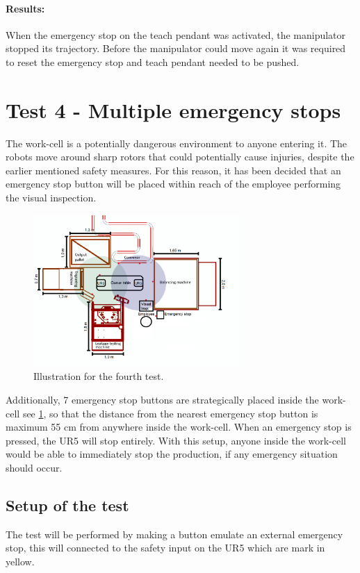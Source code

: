 \paragraph{Results: }
When the emergency stop on the teach pendant was activated, the manipulator stopped its trajectory. Before the manipulator could move again it was required to reset the emergency stop and teach pendant needed to be pushed.\\

\section{Test 4 - Multiple emergency stops}
The work-cell is a potentially dangerous environment to anyone entering it. The robots move around sharp rotors that could potentially cause injuries, despite the earlier mentioned safety measures. For this reason, it has been decided that an emergency stop button will be placed within reach of the employee performing the visual inspection.
\begin{figure}[H]
    \centering
    \includegraphics[width=0.7\textwidth]{Design/Work_cell_10.png}
    \caption{Illustration for the fourth test.}
    \label{fig:fourthtest}
\end{figure}
Additionally, 7 emergency stop buttons are strategically placed inside the work-cell see \ref{fig:fourthtest}, so that the distance from the nearest emergency stop button is maximum 55 cm from anywhere inside the work-cell. When an emergency stop is pressed, the UR5 will stop entirely. With this setup, anyone inside the work-cell would be able to immediately stop the production, if any emergency situation should occur. \\
\subsection{Setup of the test}
The test will be performed by making a button emulate an external emergency stop, this will connected to the safety input on the UR5 which are mark in yellow.

